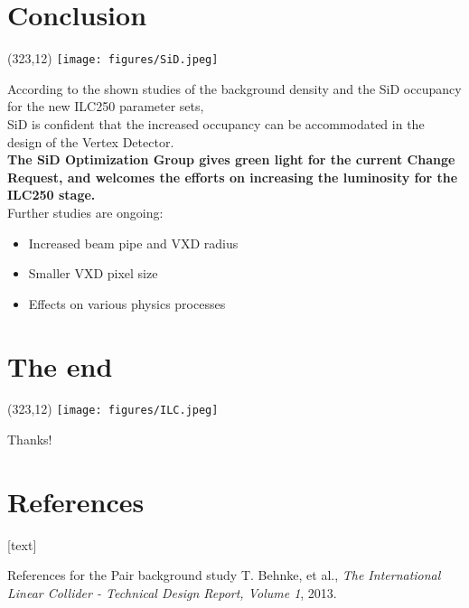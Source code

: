 \documentclass[xcolor={dvipsnames}]{beamer}
\newcommand{\sidlogo}{
  \setlength{\TPHorizModule}{1pt}
  \setlength{\TPVertModule}{1pt}
  \begin{textblock}{1}(323,12)
   \texttt{[image: figures/SiD.jpeg]}
  \end{textblock}
  }
\newcommand{\ilclogo}{
  \setlength{\TPHorizModule}{1pt}
  \setlength{\TPVertModule}{1pt}
  \begin{textblock}{1}(323,12)
   \texttt{[image: figures/ILC.jpeg]}
  \end{textblock}
}
\begin{document}
\section{Conclusion}
\begin{frame}
\sidlogo
 According to the shown studies of the background density and the SiD occupancy for the new ILC250 parameter sets,\\
 \alert{SiD is confident that the increased occupancy can be accommodated in the design of the Vertex Detector.}\\
 \textbf{The SiD Optimization Group gives green light for the current Change Request, and welcomes the efforts on increasing the luminosity for the ILC250 stage.}\\
 \vspace*{0.5cm}
 Further studies are ongoing:
 \begin{itemize}
  \item Increased beam pipe and VXD radius
  \item Smaller VXD pixel size
  \item Effects on various physics processes
 \end{itemize}

\end{frame}



\section*{The end}
{
\begin{frame}
\ilclogo
\begin{center}
\textcolor{RubineRed}{
	\LARGE Thanks!\\
}
\end{center}
\end{frame}
}

\section*{References}
\begin{thebibliography}{9}
[text]
\begin{frame}{References for the Pair background study}
\tiny
{}
 T. Behnke, et al., \emph{The International Linear Collider - Technical Design Report, Volume 1}, 2013.
\end{frame}
\end{thebibliography}
\end{document}
